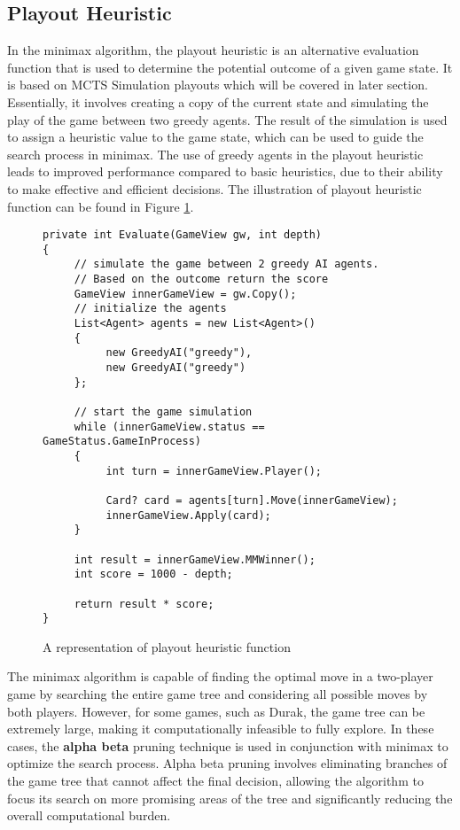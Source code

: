 \subsection{Playout Heuristic}

In the minimax algorithm, the playout heuristic is an alternative evaluation function that is used to determine the potential outcome of a given game state. It is based on MCTS Simulation playouts which will be covered in later section. Essentially, it involves creating a copy of the current state and simulating the play of the game between two greedy agents. The result of the simulation is used to assign a heuristic value to the game state, which can be used to guide the search process in minimax. The use of greedy agents in the playout heuristic leads to improved performance compared to basic heuristics, due to their ability to make effective and efficient decisions. The illustration of playout heuristic function can be found in Figure \ref{fig:playoutEval}.

\begin{figure}[h]
\captionsetup{justification=centering}
\begin{lstlisting}[frame=single]
private int Evaluate(GameView gw, int depth)
{
     // simulate the game between 2 greedy AI agents. 
     // Based on the outcome return the score
     GameView innerGameView = gw.Copy();
     // initialize the agents
     List<Agent> agents = new List<Agent>()
     {
          new GreedyAI("greedy"),
          new GreedyAI("greedy")
     };

     // start the game simulation
     while (innerGameView.status == GameStatus.GameInProcess)
     {
          int turn = innerGameView.Player();

          Card? card = agents[turn].Move(innerGameView);
          innerGameView.Apply(card);
     }

     int result = innerGameView.MMWinner();
     int score = 1000 - depth;

     return result * score;
}
\end{lstlisting}
\caption{A representation of playout heuristic function}
\label{fig:playoutEval}
\end{figure}

The minimax algorithm is capable of finding the optimal move in a two-player game by searching the entire game tree and considering all possible moves by both players. However, for some games, such as Durak, the game tree can be extremely large, making it computationally infeasible to fully explore. In these cases, the \textbf{alpha beta} pruning technique is used in conjunction with minimax to optimize the search process. Alpha beta pruning involves eliminating branches of the game tree that cannot affect the final decision, allowing the algorithm to focus its search on more promising areas of the tree and significantly reducing the overall computational burden.

